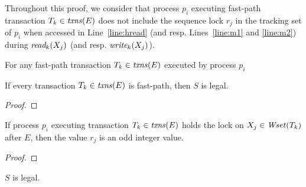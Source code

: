 Throughout this proof, we consider that process $p_i$ executing fast-path transaction $T_k \in \ms{txns}(E)$
does not include the sequence lock $r_j$ in the tracking set of $p_i$ when accessed in Line~\ref{line:hread}
(and resp. Lines~\ref{line:m1} and \ref{line:m2}) during
$\textit{read}_k(X_j)$ (and resp. $\textit{write}_k(X_j)$).
%
\begin{claim}
\label{cl:aborts}
%
For any fast-path transaction $T_k \in \ms{txns}(E)$ executed by process $p_i$ 
\end{claim}
%
\begin{claim}
\label{cl:fast}
If every transaction $T_k \in \ms{txns}(E)$ is fast-path, then $S$ is legal.
\end{claim}
%
\begin{proof}
%
\end{proof}
%
\begin{claim}
\label{cl:alg1claim}
%
If process $p_i$ executing transaction $T_k\in \ms{txns}(E)$ holds the lock on $X_j\in \ms{Wset}(T_k)$ after $E$, then the value $r_j$ is an odd integer value.
\end{claim}
%
\begin{proof}
%
\end{proof}
%
%
\begin{claim}
\label{cl:readfrom}
$S$ is legal.
\end{claim}
%
